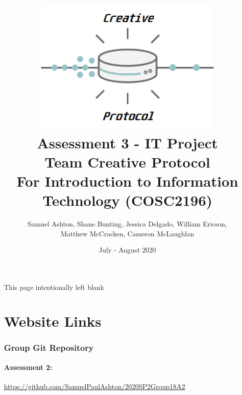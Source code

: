 \documentclass[11pt, oneside, a4paper, titlepage]{article}
\begin{document}
\title{\includegraphics[width=0.7\textwidth]{creative_protocol3}\\
Assessment 3 - IT Project\\
Team Creative Protocol\\
For Introduction to Information Technology (COSC2196)
\\
}

\author{Samuel Ashton, Shane Bunting, Jessica Delgado, William Ericson,\\
 Matthew McCracken, Cameron McLaughlan}

\date{July - August 2020}

\maketitle


\vspace*{\fill}
\begin{center}
This page intentionally left blank
\end{center}
\vspace*{\fill}
\newpage


\tableofcontents
\newpage

\section{Website Links}
\subsubsection{Group Git Repository}
\paragraph{Assessment 2:}\url{https://github.com/SamuelPaulAshton/2020SP2Group18A2}
\end{document}
